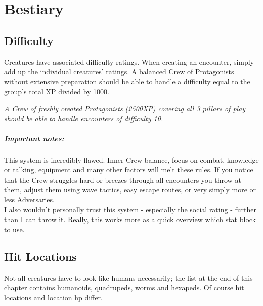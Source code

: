 \documentclass[12pt,a4paper,openany,usenames,dvipsnames]{book}
\begin{document}
	\chapter{Bestiary}
	\section{Difficulty}
	Creatures have associated difficulty ratings.
	When creating an encounter, simply add up the individual creatures' ratings.
	A balanced Crew of Protagonists without extensive preparation
		should be able to handle a difficulty equal to the group's total XP divided by 1000.
	\begin{exampleblock}
		\itshape
		A Crew of freshly created Protagonists (2500XP)
			covering all 3 pillars of play
			should be able to handle encounters of difficulty 10.
	\end{exampleblock}
	\paragraph{Important notes:}
	This system is incredibly flawed.
	Inner-Crew balance, focus on combat, knowledge or talking,
		equipment and many other factors will melt these rules.
	If you notice that the Crew struggles hard or breezes through all encounters you throw at them,
		adjust them using wave tactics, easy escape routes, or very simply more or less Adversaries.
	\\%
	I also wouldn't personally trust this system - especially the social rating - further than I can throw it. Really, this works more as a quick overview which stat block to use.
	
	\section{Hit Locations}
	Not all creatures have to look like humans necessarily; the list at the end of this chapter contains humanoids, quadrupeds, worms and hexapeds. Of course hit locations and location hp differ.
	
\end{document}
